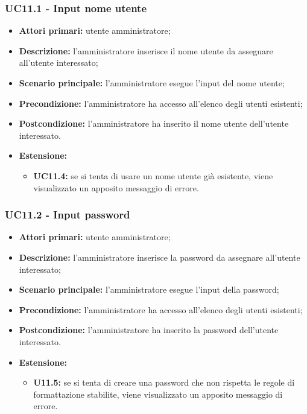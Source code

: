 \subsubsection{UC11.1 - Input nome utente}
	\begin{itemize}
		\item \textbf{Attori primari:} utente amministratore;
		\item \textbf{Descrizione:} l'amministratore inserisce il nome utente da assegnare all'utente interessato;
		\item \textbf{Scenario principale:} l'amministratore esegue l'input del nome utente;
		\item \textbf{Precondizione:} l'amministratore ha accesso all'elenco degli utenti esistenti;
		\item \textbf{Postcondizione:} l'amministratore ha inserito il nome utente dell'utente interessato.
		\item \textbf{Estensione:}
		\begin{itemize}
			\item \textbf{UC11.4:} se si tenta di usare un nome utente già esistente, viene visualizzato un apposito messaggio di errore.
		\end{itemize}
	\end{itemize}

\subsubsection{UC11.2 - Input password}
	\begin{itemize}
		\item \textbf{Attori primari:} utente amministratore;
		\item \textbf{Descrizione:} l'amministratore inserisce la password da assegnare all'utente interessato;
		\item \textbf{Scenario principale:} l'amministratore esegue l'input della password;
		\item \textbf{Precondizione:} l'amministratore ha accesso all'elenco degli utenti esistenti;
		\item \textbf{Postcondizione:} l'amministratore ha inserito la password dell'utente interessato.
		\item \textbf{Estensione:}
		\begin{itemize}
			\item \textbf{U11.5:} se si tenta di creare una password che non rispetta le regole di formattazione stabilite, viene visualizzato un apposito messaggio di errore.
		\end{itemize}
	\end{itemize}

